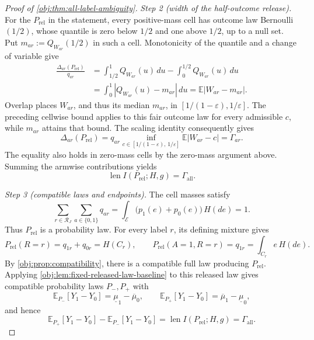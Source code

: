\begin{proof}[Proof of \cref{obj:thm:all-label-ambiguity}]
\textit{Step 2 (width of the half-outcome release).}
For the \(P_{\mathrm{rel}}\) in the statement, every positive-mass cell has outcome law Bernoulli\((1/2)\), whose quantile is zero below \(1/2\) and one above \(1/2\), up to a null set. Put \(m_{ar}:=Q_{W_{ar}}(1/2)\) in such a cell. Monotonicity of the quantile and a change of variable give
\[
\begin{aligned}
\frac{\Delta_{ar}(P_{\mathrm{rel}})}{q_{ar}}
&=\int_{1/2}^1Q_{W_{ar}}(u)\,du
  -\int_0^{1/2}Q_{W_{ar}}(u)\,du\\
&=\int_0^1|Q_{W_{ar}}(u)-m_{ar}|\,du
 =\mathbb E|W_{ar}-m_{ar}|.
\end{aligned}
\]
Overlap places \(W_{ar}\), and thus its median \(m_{ar}\), in
\([1/(1-\varepsilon),1/\varepsilon]\). The preceding cellwise bound applies to this fair outcome law for every admissible \(c\), while \(m_{ar}\) attains that bound. The scaling identity consequently gives
\[
\Delta_{ar}(P_{\mathrm{rel}})
=q_{ar}\inf_{c\in[1/(1-\varepsilon),\,1/\varepsilon]}
       \mathbb E|W_{ar}-c|
=\Gamma_{ar}.
\]
The equality also holds in zero-mass cells by the zero-mass argument above. Summing the armwise contributions yields
\[
\operatorname{len}I(P_{\mathrm{rel}};H,g)
=\Gamma_{\mathrm{all}}.
\]

\textit{Step 3 (compatible laws and endpoints).}
The cell masses satisfy
\[
\sum_{r\in\mathcal R_J}\sum_{a\in\{0,1\}}q_{ar}
=\int_{\mathcal E}\bigl(p_1(e)+p_0(e)\bigr)\,H(de)=1.
\]
Thus \(P_{\mathrm{rel}}\) is a probability law. For every label \(r\), its defining mixture gives
\[
P_{\mathrm{rel}}(R=r)=q_{1r}+q_{0r}=H(C_r),
\qquad
P_{\mathrm{rel}}(A=1,R=r)=q_{1r}
=\int_{C_r}e\,H(de).
\]
By \cref{obj:prop:compatibility}, there is a compatible full law producing \(P_{\mathrm{rel}}\). Applying \cref{obj:lem:fixed-released-law-baseline} to this released law gives compatible probability laws \(P_-,P_+\) with
\[
\mathbb E_{P_-}[Y_1-Y_0]=\underline\mu_1-\overline\mu_0,
\qquad
\mathbb E_{P_+}[Y_1-Y_0]=\overline\mu_1-\underline\mu_0,
\]
and hence
\[
\mathbb E_{P_+}[Y_1-Y_0]-\mathbb E_{P_-}[Y_1-Y_0]
=\operatorname{len}I(P_{\mathrm{rel}};H,g)
=\Gamma_{\mathrm{all}}.
\]


\end{proof}
